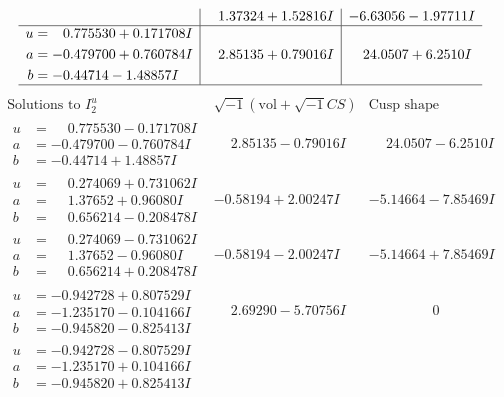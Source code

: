 \documentclass[1p]{elsarticle_modified}
\theoremstyle{definition}
\newcommand{\I}{\sqrt{-1}}
\begin{document}
$$\begin{array}{c|c|c}
 & \phantom{-}1.37324 + 1.52816 I & -6.63056 - 1.97711 I \\ \hline\begin{aligned}
u &= \phantom{-}0.775530 + 0.171708 I \\
a &= -0.479700 + 0.760784 I \\
b &= -0.44714 - 1.48857 I\end{aligned}
 & \phantom{-}2.85135 + 0.79016 I & \phantom{-}24.0507 + 6.2510 I\\
 \hline 
 \end{array}$$\newpage$$\begin{array}{c|c|c}  
\text{Solutions to }I^u_{2}& \I (\text{vol} + \sqrt{-1}CS) & \text{Cusp shape}\\
 \hline 
\begin{aligned}
u &= \phantom{-}0.775530 - 0.171708 I \\
a &= -0.479700 - 0.760784 I \\
b &= -0.44714 + 1.48857 I\end{aligned}
 & \phantom{-}2.85135 - 0.79016 I & \phantom{-}24.0507 - 6.2510 I \\ \hline\begin{aligned}
u &= \phantom{-}0.274069 + 0.731062 I \\
a &= \phantom{-}1.37652 + 0.96080 I \\
b &= \phantom{-}0.656214 - 0.208478 I\end{aligned}
 & -0.58194 + 2.00247 I & -5.14664 - 7.85469 I \\ \hline\begin{aligned}
u &= \phantom{-}0.274069 - 0.731062 I \\
a &= \phantom{-}1.37652 - 0.96080 I \\
b &= \phantom{-}0.656214 + 0.208478 I\end{aligned}
 & -0.58194 - 2.00247 I & -5.14664 + 7.85469 I \\ \hline\begin{aligned}
u &= -0.942728 + 0.807529 I \\
a &= -1.235170 - 0.104166 I \\
b &= -0.945820 - 0.825413 I\end{aligned}
 & \phantom{-}2.69290 - 5.70756 I & \phantom{-0.000000 } 0 \\ \hline\begin{aligned}
u &= -0.942728 - 0.807529 I \\
a &= -1.235170 + 0.104166 I \\
b &= -0.945820 + 0.825413 I\end{aligned}

\end{array}$$
\end{document}
